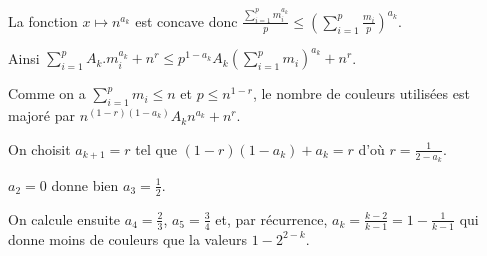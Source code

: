 \begin{Answer}
La fonction $x \mapsto n^{a_k}$ est concave donc $\displaystyle \frac {\sum_{i=1}^p m_i^{a_k}}p\le \left(\sum_{i=1}^p \frac {m_i}p\right)^{a_k}$.

Ainsi $\displaystyle \sum_{i=1}^p A_k.m_i^{a_k}+n^r\le p^{1-a_k} A_k \left(\sum_{i=1}^p  m_i\right)^{a_k} + n^r$.

Comme on a $\displaystyle \sum_{i=1}^p  m_i\le n$ et $p \le n^{1-r}$, le nombre de couleurs utilisées est majoré par
$\displaystyle n^{(1-r)(1-a_k)} A_k n^{a_k} + n^r$.

On choisit $a_{k+1}= r$ tel que $(1-r)(1-a_k)+a_k=r$ d'où $r = \frac 1{2-a_k}$.

$a_2=0$ donne bien $a_3 = \frac 12$.

On calcule ensuite $a_4 = \frac 23$, $a_5 = \frac 34$ et, par récurrence, $a_k = \frac{k-2}{k-1}=1 - \frac 1{k-1}$ qui donne moins de couleurs que la valeurs $1 -2^{2-k}$.
\end{Answer}
